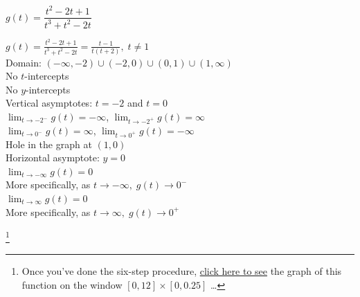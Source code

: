 \documentclass{ximera}
\begin{document}
\begin{question}
\begin{problem}
\begin{solution}
\begin{center} 
\end{center} 
\end{solution}
\end{problem} 

\begin{problem}\label{sixsteplast}

$g(t) = \dfrac{t^{2} - 2t + 1}{t^{3} + t^{2} - 2t}$ 

\begin{solution}
$g(t) = \frac{t^{2} - 2t + 1}{t^{3} + t^{2} - 2t}=\frac{t - 1}{t(t + 2)}, \; t \neq 1$\\
Domain: $(-\infty, -2) \cup (-2, 0) \cup (0, 1) \cup (1, \infty)$\\
No $t$-intercepts\\
No $y$-intercepts\\
Vertical asymptotes: $t = -2$ and $t = 0$\\
$\lim_{t \rightarrow -2^{-}} g(t) = -\infty$, $\lim_{t \rightarrow -2^{+}} g(t) = \infty$\\
$\lim_{t \rightarrow 0^{-}} g(t) = \infty$, $\lim_{t \rightarrow 0^{+}} g(t) = -\infty$\\
Hole in the graph at $(1, 0)$\\
Horizontal asymptote: $y = 0$\\
$\lim_{t \rightarrow -\infty} g(t) = 0$\\
More specifically, as $t \rightarrow -\infty, \; g(t) \rightarrow 0^{-}$\\
$\lim_{t \rightarrow \infty} g(t) = 0$\\
More specifically, as $t \rightarrow \infty, \; g(t) \rightarrow 0^{+}$\\

\begin{center} 
\end{center} 
\end{solution}

\footnote{Once you've done the six-step procedure, \href{https://www.desmos.com/calculator/gdjsplqomf}{click here to see}  the graph of this function on the window $[0, 12] \times [0, 0.25]$ \ldots}
\end{problem} 

\end{question}
\end{document}
